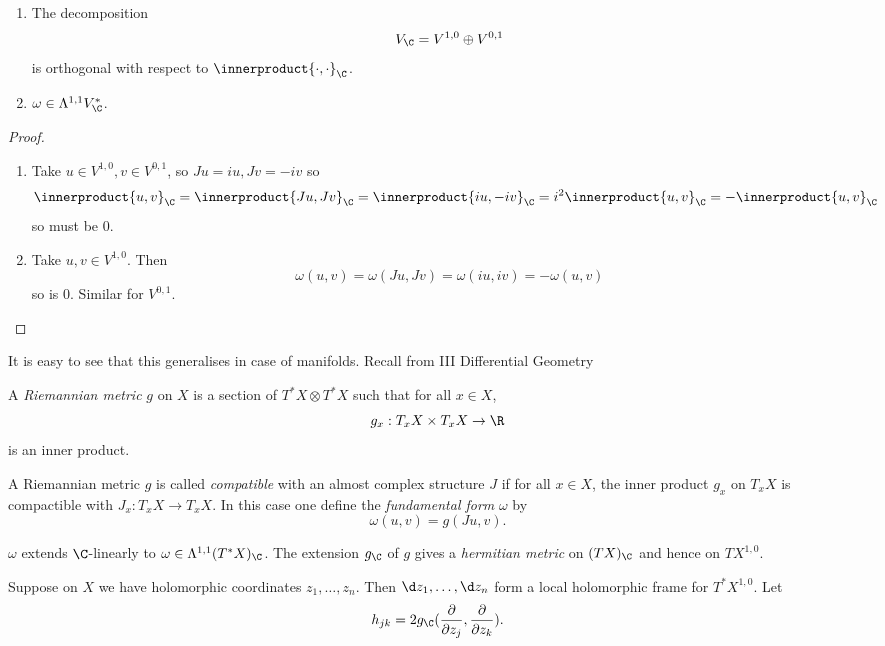 \documentclass[a4paper]{article}
\newcommand*{\ip}{\innerproduct}
\begin{document}
\begin{lemma}\leavevmode
  \begin{enumerate}
  \item The decomposition
    \[
      V_\C = V^{1, 0} \oplus V^{0, 1}
    \]
    is orthogonal with respect to \(\ip{\cdot, \cdot}_\C\).
  \item \(\omega \in \Lambda^{1, 1} V_\C^*\).
  \end{enumerate}
\end{lemma}

\begin{proof}\leavevmode
  \begin{enumerate}
  \item Take \(u \in V^{1, 0}, v \in V^{0, 1}\), so \(Ju = iu, Jv = -iv\) so
    \[
      \ip{u, v}_\C
      = \ip{Ju, Jv}_\C
      = \ip{iu, -iv}_\C
      = i^2 \ip{u, v}_\C
      = -\ip{u, v}_\C
    \]
    so must be \(0\).
  \item Take \(u, v \in V^{1, 0}\). Then
    \[
      \omega(u, v)
      = \omega(Ju, Jv)
      = \omega(iu, iv)
      = -\omega(u, v)
    \]
    so is \(0\). Similar for \(V^{0, 1}\).
  \end{enumerate}
\end{proof}

It is easy to see that this generalises in case of manifolds. Recall from III Differential Geometry

\begin{definition}
  A \emph{Riemannian metric} \(g\) on \(X\) is a section of \(T^*X \otimes T^*X\) such that for all \(x \in X\),
  \[
    g_x: T_xX \times T_xX \to \R
  \]
  is an inner product.
\end{definition}

\begin{definition}
  A Riemannian metric \(g\) is called \emph{compatible} with an almost complex structure \(J\) if for all \(x \in X\), the inner product \(g_x\) on \(T_xX\) is compactible with \(J_x: T_xX \to T_xX\). In this case one define the \emph{fundamental form} \(\omega\) by
  \[
    \omega(u, v) = g(Ju, v).
  \]
\end{definition}
\(\omega\) extends \(\C\)-linearly to \(\omega \in \Lambda^{1, 1} (T^*X)_\C\). The extension \(g_\C\) of \(g\) gives a \emph{hermitian metric} on \((TX)_\C\) and hence on \(TX^{1, 0}\).

Suppose on \(X\) we have holomorphic coordinates \(z_1, \dots, z_n\). Then \(\d z_1, \dots, \d z_n\) form a local holomorphic frame for \(T^*X^{1, 0}\). Let
\[
  h_{jk} = 2 g_\C(\frac{\partial  }{\partial z_j}, \frac{\partial  }{\partial z_k}).
\]
\end{document}
